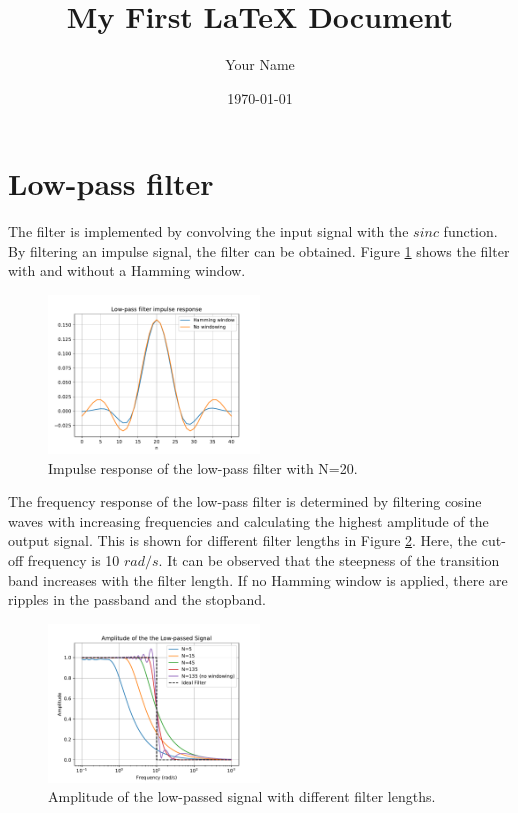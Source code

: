 \documentclass{article}
\title{My First LaTeX Document}
\author{Your Name}
\date{\today}
\begin{document}
\maketitle

\section{Low-pass filter}

The filter is implemented by convolving the input signal with the \(sinc\) function.
By filtering an impulse signal, the filter can be obtained.
Figure \ref{fig:low_pass_filter} shows the filter with and without a Hamming window.

\begin{figure}[h!]
    \centering
    \includegraphics[width=0.5\textwidth]{figures/impulse_response.pdf}
    \caption{Impulse response of the low-pass filter with N=20.}
    \label{fig:low_pass_filter}
\end{figure}

The frequency response of the low-pass filter is determined by filtering cosine waves with increasing frequencies
and calculating the highest amplitude of the output signal.
This is shown for different filter lengths in Figure \ref{fig:cut_off}.
Here, the cut-off frequency is 10 \({rad}/s\).
It can be observed that the steepness of the transition band increases with the filter length.
If no Hamming window is applied, there are ripples in the passband and the stopband.

\begin{figure}[h!]
    \centering
    \includegraphics[width=0.5\textwidth]{figures/passband.pdf}
    \caption{Amplitude of the low-passed signal with different filter lengths.}
    \label{fig:cut_off}
\end{figure}
\end{document}
